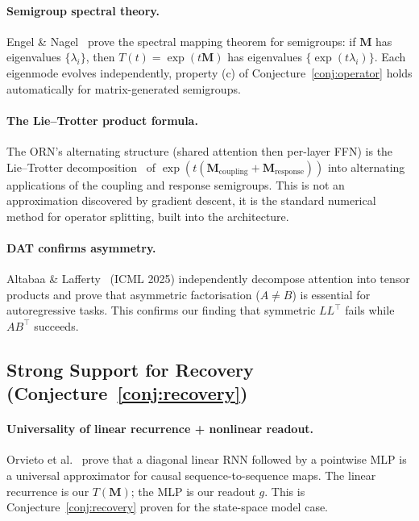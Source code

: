 \documentclass[11pt, a4paper]{article}
\newcommand{\M}{\mathbf{M}}
\theoremstyle{plain}
\theoremstyle{definition}
\theoremstyle{remark}
\begin{document}
\paragraph{Semigroup spectral theory.}
Engel \& Nagel~\cite{engel2000semigroups} prove the spectral mapping theorem for semigroups: if $\M$ has eigenvalues $\{\lambda_i\}$, then $T(t) = \exp(t\M)$ has eigenvalues $\{\exp(t\lambda_i)\}$.
Each eigenmode evolves independently, property (c) of Conjecture~\ref{conj:operator} holds automatically for matrix-generated semigroups.

\paragraph{The Lie--Trotter product formula.}
The ORN's alternating structure (shared attention then per-layer FFN) is the Lie--Trotter decomposition~\cite{trotter1959product} of $\exp(t(\M_{\mathrm{coupling}} + \M_{\mathrm{response}}))$ into alternating applications of the coupling and response semigroups.
This is not an approximation discovered by gradient descent, it is the standard numerical method for operator splitting, built into the architecture.

\paragraph{DAT confirms asymmetry.}
Altabaa \& Lafferty~\cite{altabaa2024dat} (ICML 2025) independently decompose attention into tensor products and prove that asymmetric factorisation ($A \neq B$) is essential for autoregressive tasks.
This confirms our finding that symmetric $LL^\top$ fails while $AB^\top$ succeeds.

\subsection{Strong Support for Recovery (Conjecture~\ref{conj:recovery})}

\paragraph{Universality of linear recurrence + nonlinear readout.}
Orvieto et al.~\cite{orvieto2023universality} prove that a diagonal linear RNN followed by a pointwise MLP is a universal approximator for causal sequence-to-sequence maps.
The linear recurrence is our $T(\M)$; the MLP is our readout $g$.
This is Conjecture~\ref{conj:recovery} proven for the state-space model case.
\end{document}
